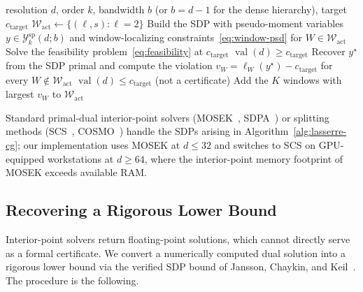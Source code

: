 \documentclass[11pt, letterpaper]{article}
\theoremstyle{paperplain}
\theoremstyle{paperdef}
\newcommand{\val}{\operatorname{val}}
\begin{document}
\begin{algorithm}[H]
\caption{Lasserre SDP Lower Bound with Constraint Generation}
\label{alg:lasserre-cg}
\begin{algorithmic}[1]
\Require resolution $d$, order $k$, bandwidth $b$ (or $b=d-1$ for the
  dense hierarchy), target $c_{\mathrm{target}}$
\State $\mathcal{W}_{\text{act}}\gets \{(\ell,s): \ell=2\}$
\Loop
  \State Build the SDP with pseudo-moment variables
    $y\in\mathcal{Y}_k^{\mathrm{sp}}(d;b)$ and window-localizing
    constraints~\eqref{eq:window-psd} for $W\in\mathcal{W}_{\text{act}}$
  \State Solve the feasibility problem~\eqref{eq:feasibility} at
    $c_{\mathrm{target}}$
   \Return {}
    $\val(d)\ge c_{\mathrm{target}}$
  \EndIf
  \State Recover $y^\star$ from the SDP primal and compute the
    violation
    $v_W = \ell_W(y^\star) - c_{\mathrm{target}}$ for every
    $W\notin\mathcal{W}_{\text{act}}$
    \Return {} $\val(d)\le c_{\mathrm{target}}$
      (not a certificate)
  \EndIf
  \State Add the $K$ windows with largest $v_W$ to
    $\mathcal{W}_{\text{act}}$
\EndLoop
\end{algorithmic}
\end{algorithm}

Standard primal-dual interior-point solvers
(MOSEK~\cite{MOSEK}, SDPA~\cite{SDPA}) or splitting methods
(SCS~\cite{SCS}, COSMO~\cite{COSMO}) handle the SDPs arising in
Algorithm~\ref{alg:lasserre-cg}; our implementation uses MOSEK at
$d\le 32$ and switches to SCS on GPU-equipped workstations at
$d\ge 64$, where the interior-point memory footprint of MOSEK exceeds
available RAM.

\subsection{Recovering a Rigorous Lower Bound}

Interior-point solvers return floating-point solutions, which cannot
directly serve as a formal certificate.  We convert a numerically
computed dual solution into a rigorous lower bound via the verified
SDP bound of Jansson, Chaykin, and
Keil~\cite{JanssonChaykinKeil2008}.  The procedure is the following.
\end{document}
